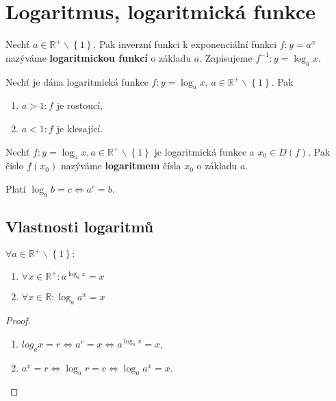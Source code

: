 \section{Logaritmus, logaritmická funkce}
\begin{definition}
    Nechť $a \in \mathbb R^+ \smallsetminus\left \{ 1 \right \} $. Pak inverzní
    funkci k exponenciální funkci $f:y=a^x$ nazýváme \textbf{logaritmickou
    funkcí} o základu $a$. Zapisujeme $f^{-1}: y=\log_a x.$
\end{definition}

\begin{veta}
    Nechť je dána logaritmická funkce $f:y=\log_a x$, $a \in \mathbb R^+ \smallsetminus
    \left \{ 1 \right \} $. Pak
    \begin{enumerate}[$i.$]
        \item $a>1: f$ je rostoucí,
       	\item $a < 1: f$ je klesající.
    \end{enumerate}
\end{veta}

\begin{definition}
    Nechť $f: y=\log_a x, a \in \mathbb R^+ \smallsetminus \left \{ 1 \right \}$ je
    logaritmická funkce a $x_0\in D(f).$ Pak číslo $f(x_0)$ nazýváme
    \textbf{logaritmem} čísla $x_0$ o základu $a.$
\end{definition}

\begin{pozn}
    Platí $\log_a b=c \iff a^c = b.$
\end{pozn}

\subsection*{Vlastnosti logaritmů}
\begin{veta}
    $\forall a \in \mathbb R^+ \smallsetminus \left \{ 1 \right \}:$
    \begin{enumerate}[$i.$]
        \item $\forall x \in \mathbb R^+: a^{\log_a x}=x$
       	\item $\forall x \in \mathbb R: \log_a a^x=x$
    \end{enumerate}
\end{veta}

\begin{proof}
    \,
    \begin{enumerate}[$i.$]
        \item $log_a x = r \iff a^r = x \iff a^{\log_a x}=x,$
       	\item $a^x = r \iff \log_a r=c \iff \log_a a^x = x.$ \qedhere
    \end{enumerate}
\end{proof}

